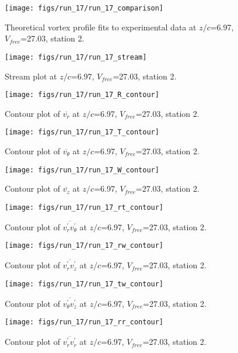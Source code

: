 \begin{figure}[H]
\centering
\texttt{[image: figs/run\_17/run\_17\_comparison]}
\caption{Theoretical vortex profile fits to experimental data at $z/c$=6.97, $V_{free}$=27.03, station 2.}
\end{figure}


\begin{figure}[H]
\centering
\texttt{[image: figs/run\_17/run\_17\_stream]}
\caption{Stream plot at $z/c$=6.97, $V_{free}$=27.03, station 2.}
\end{figure}


\begin{figure}[H]
\centering
\texttt{[image: figs/run\_17/run\_17\_R\_contour]}
\caption{Contour plot of $\overline{v_{r}}$ at $z/c$=6.97, $V_{free}$=27.03, station 2.}
\end{figure}


\begin{figure}[H]
\centering
\texttt{[image: figs/run\_17/run\_17\_T\_contour]}
\caption{Contour plot of $\overline{v_{\theta}}$ at $z/c$=6.97, $V_{free}$=27.03, station 2.}
\end{figure}


\begin{figure}[H]
\centering
\texttt{[image: figs/run\_17/run\_17\_W\_contour]}
\caption{Contour plot of $\overline{v_{z}}$ at $z/c$=6.97, $V_{free}$=27.03, station 2.}
\end{figure}


\begin{figure}[H]
\centering
\texttt{[image: figs/run\_17/run\_17\_rt\_contour]}
\caption{Contour plot of $\overline{v_{r}^{\prime} v_{\theta}^{\prime}}$ at $z/c$=6.97, $V_{free}$=27.03, station 2.}
\end{figure}


\begin{figure}[H]
\centering
\texttt{[image: figs/run\_17/run\_17\_rw\_contour]}
\caption{Contour plot of $\overline{v_{r}^{\prime} v_{z}^{\prime}}$ at $z/c$=6.97, $V_{free}$=27.03, station 2.}
\end{figure}


\begin{figure}[H]
\centering
\texttt{[image: figs/run\_17/run\_17\_tw\_contour]}
\caption{Contour plot of $\overline{v_{\theta}^{\prime} v_{z}^{\prime}}$ at $z/c$=6.97, $V_{free}$=27.03, station 2.}
\end{figure}


\begin{figure}[H]
\centering
\texttt{[image: figs/run\_17/run\_17\_rr\_contour]}
\caption{Contour plot of $\overline{v_{r}^{\prime} v_{r}^{\prime}}$ at $z/c$=6.97, $V_{free}$=27.03, station 2.}
\end{figure}


